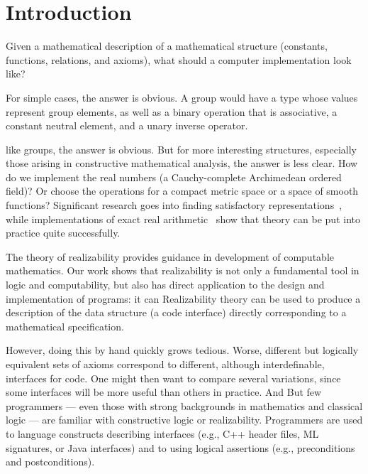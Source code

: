 \section{Introduction}
\label{sec:introduction}

Given a mathematical description of a mathematical structure (constants,
functions, relations, and axioms), what should a computer
implementation look like?

For simple cases,
\iflong
the answer is obvious. A
group would have a type whose values represent group elements, as well
as a binary operation that is associative, a constant 
neutral element, and a unary inverse operator.

\else %
like groups, the answer is obvious.
\fi %
%
But for more interesting structures, especially those arising in
constructive mathematical analysis, the answer is less clear. How do we
implement the real numbers (a Cauchy-complete Archimedean ordered
field)? Or choose the operations for a compact metric
space or a space of smooth functions? Significant research goes into
finding satisfactory representations~\cite{Wei00,TZ98,Bla97,EL00}, while
implementations of exact real arithmetic~\cite{Mue00,Lam05a} show that
theory can be put into practice quite successfully.

\iflong
The theory of realizability provides guidance in development of
computable mathematics.  Our work shows that realizability is
not only  a
fundamental tool in logic and computability, but also
has direct application to the design and implementation of programs:
it can
\else %
Realizability theory can be used to 
\fi %
produce a description of the data structure (a code interface)
directly corresponding to a mathematical specification.
%
\iflong

\fi %
%
\iflong
However, doing this by hand quickly grows tedious. 
Worse, different
but logically equivalent sets of axioms correspond to different,
although interdefinable, interfaces for code. One might then want to
compare several variations, since some interfaces will be more useful
than others in practice.
And 
\else
But
\fi %
few programmers --- even those with strong backgrounds in
mathematics and classical logic --- are familiar with constructive logic or
realizability. 
\iflong
Programmers are used to language constructs
describing interfaces (e.g., C++ header files, ML signatures, or Java
interfaces) and to using logical assertions (e.g., preconditions
and postconditions).
\fi

